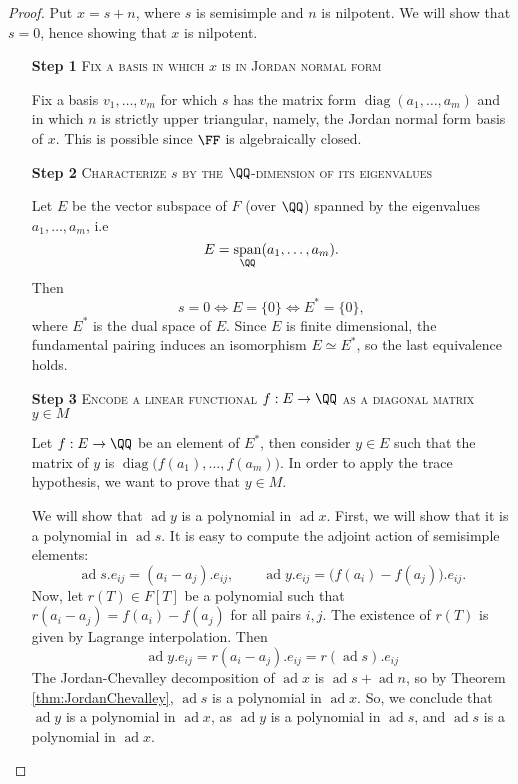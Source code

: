 \documentclass{article}
\DeclareMathOperator{\diag}{diag}
\DeclareMathOperator{\opspan}{span}
\newcommand*\ad{\operatorname{ad}}
\newcommand*\acts{.}
\begin{document}
\begin{proof}
    Put $x = s + n$, where $s$ is semisimple and $n$ is nilpotent.
    We will show that $s=0$, hence showing that $x$ is nilpotent.
    \begin{itemize}
        \item[\textbf{Step 1}]
            \textsc{\color{Crimson} Fix a basis in which $x$ is in Jordan normal form}

            Fix a basis $v_1,\ldots,v_m$ for which $s$ has the matrix form $\diag(a_1,\ldots,a_m)$ and in which $n$ is strictly upper triangular, namely, the Jordan normal form basis of $x$.
            This is possible since $\FF$ is algebraically closed.

        \item[\textbf{Step 2}]
            \textsc{\color{Crimson} Characterize $s$ by the $\QQ$-dimension of its eigenvalues}

            Let $E$ be the vector subspace of $F$ (over $\QQ$) spanned by the eigenvalues $a_1,\ldots,a_m$, i.e
            \[
                E = \opspan_\QQ(a_1,\ldots,a_m).
            \]
            Then
            \[
                s = 0 \iff E = \{0\} \iff E^\ast = \{0\},
            \]
            where $E^\ast$ is the dual space of $E$.
            Since $E$ is finite dimensional, the fundamental pairing induces an isomorphism $E \simeq E^\ast$, so the last equivalence holds.

        \item[\textbf{Step 3}]
            \textsc{\color{Crimson} Encode a linear functional $f: E \to \QQ$ as a diagonal matrix $y \in M$}

            Let $f: E \to \QQ$ be an element of $E^\ast$, then consider $y \in E$ such that the matrix of $y$ is $\diag\big(f(a_1),\ldots,f(a_m)\big)$.
            In order to apply the trace hypothesis, we want to prove that $y \in M$.

            We will show that $\ad y$ is a polynomial in $\ad x$.
            First, we will show that it is a polynomial in $\ad s$.
            It is easy to compute the adjoint action of semisimple elements:
            \[
                \ad s \acts e_{ij}
                =
                (a_i - a_j) \acts e_{ij}, \qquad
                \ad y \acts e_{ij}
                =
                \big(f(a_i) - f(a_j)\big) \acts e_{ij}.
            \]
            Now, let $r(T) \in F[T]$ be a polynomial such that $r(a_i-a_j) = f(a_i)-f(a_j)$ for all pairs $i, j$.
            The existence of $r(T)$ is given by Lagrange interpolation.
            Then
            \[
                \ad y \acts e_{ij}
                =
                r(a_i-a_j) \acts e_{ij}
                =
                r(\ad s) \acts e_{ij}
            \]
            The Jordan-Chevalley decomposition of $\ad x$ is $\ad s + \ad n$, so by Theorem \ref{thm:JordanChevalley}, $\ad s$ is a polynomial in $\ad x$.
            So, we conclude that $\ad y$ is a polynomial in $\ad x$, as $\ad y$ is a polynomial in $\ad s$, and $\ad s$ is a polynomial in $\ad x$.


\end{itemize}
\end{proof}
\end{document}
